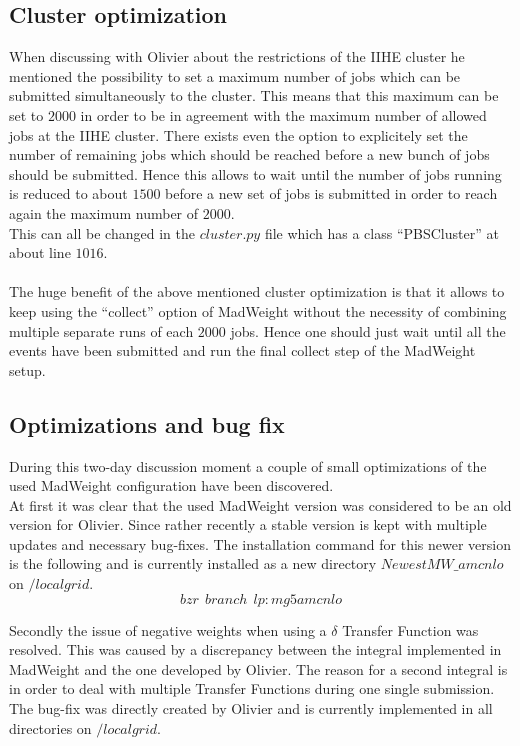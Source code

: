 \subsection{Cluster optimization}

When discussing with Olivier about the restrictions of the IIHE cluster he mentioned the possibility to set a maximum number of jobs which can be submitted simultaneously to the cluster. This means that this maximum can be set to $2000$ in order to be in agreement with the maximum number of allowed jobs at the IIHE cluster. There exists even the option to explicitely set the number of remaining jobs which should be reached before a new bunch of jobs should be submitted. Hence this allows to wait until the number of jobs running is reduced to about $1500$ before a new set of jobs is submitted in order to reach again the maximum number of $2000$.\\
This can all be changed in the $cluster.py$ file which has a class ``PBSCluster'' at about line $1016$.\\
\\
The huge benefit of the above mentioned cluster optimization is that it allows to keep using the ``collect'' option of MadWeight without the necessity of combining multiple separate runs of each $2000$ jobs. Hence one should just wait until all the events have been submitted and run the final collect step of the MadWeight setup.

\subsection{Optimizations and bug fix}

During this two-day discussion moment a couple of small optimizations of the used MadWeight configuration have been discovered.\\
At first it was clear that the used MadWeight version was considered to be an old version for Olivier. Since rather recently a stable version is kept with multiple updates and necessary bug-fixes. The installation command for this newer version is the following and is currently installed as a new directory $NewestMW\_amcnlo$ on $/localgrid$.
\begin{equation}
  bzr ~~ branch ~~ lp: mg5amcnlo \nonumber
\end{equation}

Secondly the issue of negative weights when using a $\delta$ Transfer Function was resolved. This was caused by a discrepancy between the integral implemented in MadWeight and the one developed by Olivier. The reason for a second integral is in order to deal with multiple Transfer Functions during one single submission. The bug-fix was directly created by Olivier and is currently implemented in all directories on $/localgrid$.\\

